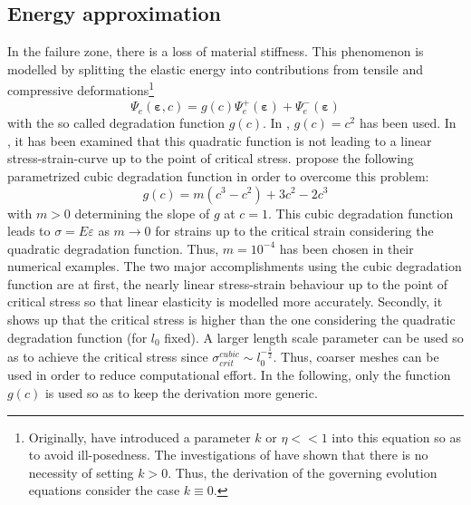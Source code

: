 \subsection{Energy approximation} \label{sec:energy_approx}
In the failure zone, there is a loss of material stiffness. This phenomenon is modelled by splitting the elastic energy into contributions from tensile and compressive deformations\footnote{Originally, \citet{09_PF_k} have introduced a parameter $k$ or $\eta<<1$ into this equation so as to avoid ill-posedness. The investigations of \citet{01_PF_dyn_brittle} have shown that there is no necessity of setting $k>0$. Thus, the derivation of the governing evolution equations consider the case $k\equiv0$.}
\begin{equation} \label{eq:el_energy}
	\Psi_{e}\left(\bm{\varepsilon},c\right)=g\left(c\right) \Psi_{e}^{+}\left(\bm{\varepsilon}\right)+\Psi_{e}^{-}\left(\bm{\varepsilon}\right)
\end{equation}
with the so called degradation function $g\left(c\right)$. In \cite{01_PF_dyn_brittle}, $g\left(c\right)=c^{2}$ has been used. In \citep{03_PF_ductile}, it has been examined that this quadratic function is not leading to a linear stress-strain-curve up to the point of critical stress. \citet{03_PF_ductile} propose the following parametrized cubic degradation function in order to overcome this problem:
\begin{equation} \label{eq:cubic_degr_fct}
	g\left(c\right)=m\left(c^{3}-c^{2}\right)+3c^{2}-2c^{3}
\end{equation}
with $m>0$ determining the slope of $g$ at $c=1$. This cubic degradation function leads to $\sigma=E\varepsilon$ as $m\rightarrow0$ for strains up to the critical strain considering the quadratic degradation function. Thus, $m=10^{-4}$ has been chosen in their numerical examples. The two major accomplishments using the cubic degradation function are at first, the nearly linear stress-strain behaviour up to the point of critical stress so that linear elasticity is modelled more accurately. Secondly, it shows up that the critical stress is higher than the one considering the quadratic degradation function (for $l_{0}$ fixed). A larger length scale parameter can be used so as to achieve the critical stress since $\sigma_{crit}^{cubic}\sim l_{0}^{-\frac{1}{2}}$. Thus, coarser meshes can be used in order to reduce computational effort. In the following, only the function $g\left(c\right)$ is used so as to keep the derivation more generic.

